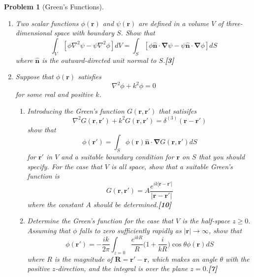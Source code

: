 \documentclass[a4paper]{article}
\theoremstyle{new}
\newtheorem{qns}{Problem}[section]
\begin{document}
\begin{qns}[Green's Functions]\leavevmode
\begin{enumerate}[label=(\roman*)]
\item Two scalar functions $\phi(\mathbf{r})$ and $\psi(\mathbf{r})$ are defined in a volume $V$ of three-dimensional space with boundary $S$. Show that
$$\int_V[\phi\nabla^2\psi-\psi\nabla^2\phi]dV=\int_S[\phi\mathbf{\hat{n}}\cdot\boldsymbol{\nabla}\psi-\psi\mathbf{\hat{n}}\cdot\boldsymbol{\nabla}\phi]dS$$
where $\mathbf{\hat{n}}$ is the outward-directed unit normal to $S$.\hfill\textbf{[3]}
\item Suppose that $\phi(\mathbf{r})$ satisfies
$$\nabla^2\phi+k^2\phi=0$$
for some real and positive $k$.
\begin{enumerate}[label=(\alph*)]
\item Introducing the Green’s function $G(\mathbf{r}, \mathbf{r'})$ that satisifes
$$\nabla^2G(\mathbf{r},\mathbf{r'})+k^2G(\mathbf{r},\mathbf{r'})=\delta^{(3)}(\mathbf{r}-\mathbf{r'})$$
show that
$$\phi(\mathbf{r'})=\int_S\phi(\mathbf{r})\mathbf{\hat{n}}\cdot\boldsymbol{\nabla}G(\mathbf{r},\mathbf{r'})dS$$
for $\mathbf{r'}$ in $V$ and a suitable boundary condition for $\mathbf{r}$ on $S$ that you should specify. For the case that $V$ is all space, show that a suitable Green’s function is
$$G(\mathbf{r},\mathbf{r'})=A\frac{e^{ik|\mathbf{r}-\mathbf{r'}|}}{|\mathbf{r}-\mathbf{r'}|}$$
where the constant $A$ should be determined.\hfill\textbf{[10]}
\item Determine the Green’s function for the case that $V$ is the half-space $z\geq0$.\\[5pt]
Assuming that $\phi$ falls to zero sufficiently rapidly as $|\mathbf{r}|\rightarrow\infty$, show that
$$\phi(\mathbf{r'})=-\frac{ik}{2\pi}\int_{z=0}\frac{e^{ikR}}{R}\bigg(1+\frac{i}{kR}\bigg)\cos\theta\phi(\mathbf{r})dS$$
where $R$ is the magnitude of $\mathbf{R}=\mathbf{r'}-\mathbf{r}$, which makes an angle $\theta$ with the positive $z$-direction, and the integral is over the plane $z=0$.\hfill\textbf{[7]}
\end{enumerate}
\end{enumerate}
\end{qns}
\newpage
\end{document}
